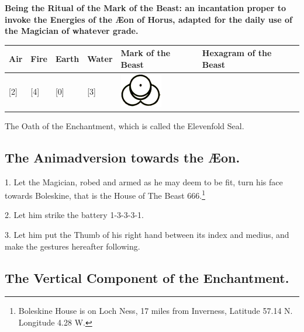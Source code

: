 
\textbf{Being the Ritual of the Mark of the Beast: an incantation proper to invoke the Energies of the {\AE}on of Horus, adapted for the daily use of the Magician of whatever grade.}

\begin{tabular}{M{1.2cm} | M{1.2cm} | M{1.2cm} | M{1.2cm} | M{1.2cm} | M{1.2cm}}
Air & Fire & Earth & Water & Mark of the Beast & Hexagram of the Beast \\ \hline
{}[2] & [4] & [0] & [3]  &\includegraphics[scale=0.45]{images/motb}\footnotemark &  \\
\end{tabular}

The Oath of the Enchantment, which is called the Elevenfold Seal.

\subsection*{The Animadversion towards the {\AE}on.}

1. Let the Magician, robed and armed as he may deem to be fit, turn his face towards Boleskine, that is the House of The Beast 666.\footnote{Boleskine House is on Loch Ness, 17 miles from Inverness, Latitude 57.14 N. Longitude 4.28 W.}

2. Let him strike the battery 1-3-3-3-1.

3. Let him put the Thumb of his right hand between its index and medius, and make the gestures hereafter following.

\subsection*{The Vertical Component of the Enchantment.}

